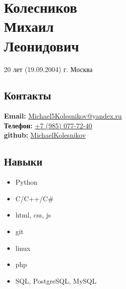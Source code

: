 \documentclass[14pt]{extarticle}
\begin{document}
\noindent
\begin{minipage}{0.35\textwidth} %
      \section*{Колесников \\ Михаил \\ Леонидович}
      20 лет (19.09.2004)
      г. Москва
      \vspace{2cm}
      \subsection*{Контакты}
      \textbf{Email:} \href{mailto:Michael5Kolesnikov@yandex.ru}{Michael5Kolesnikov@yandex.ru} \\
      \textbf{Телефон:} \href{tel:+79850777240}{+7 (985) 077-72-40} \\
      \textbf{github:} \href{https://github.com/MichaelKolesnikov}{MichaelKolesnikov} \\

      \vspace{2cm}

      \subsection*{Навыки}
      \begin{itemize}
            \item Python
            \item C/C++/C\#
            \item html, css, js
            \item git
            \item linux
            \item php
            \item SQL, PostgreSQL, MySQL
      \end{itemize}

\end{minipage}
\hfill
\vline %
\hfill
\end{document}
